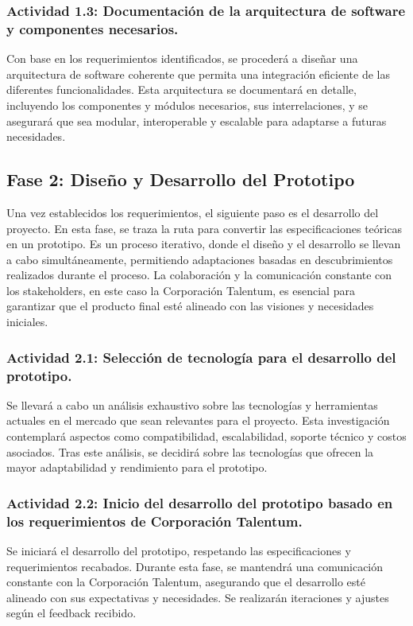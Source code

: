 \subsubsection{Actividad 1.3: Documentación de la arquitectura de software y componentes necesarios.}
Con base en los requerimientos identificados, se procederá a diseñar una arquitectura de software coherente que permita una integración eficiente de las diferentes funcionalidades. Esta arquitectura se documentará en detalle, incluyendo los componentes y módulos necesarios, sus interrelaciones, y se asegurará que sea modular, interoperable y escalable para adaptarse a futuras necesidades.

\subsection{Fase 2: Diseño y Desarrollo del Prototipo}
Una vez establecidos los requerimientos, el siguiente paso es el desarrollo del proyecto. En esta fase, se traza la ruta para convertir las especificaciones teóricas en un prototipo. Es un proceso iterativo, donde el diseño y el desarrollo se llevan a cabo simultáneamente, permitiendo adaptaciones basadas en descubrimientos realizados durante el proceso. La colaboración y la comunicación constante con los stakeholders, en este caso la Corporación Talentum, es esencial para garantizar que el producto final esté alineado con las visiones y necesidades iniciales.

\subsubsection{Actividad 2.1: Selección de tecnología para el desarrollo del prototipo.}
Se llevará a cabo un análisis exhaustivo sobre las tecnologías y herramientas actuales en el mercado que sean relevantes para el proyecto. Esta investigación contemplará aspectos como compatibilidad, escalabilidad, soporte técnico y costos asociados. Tras este análisis, se decidirá sobre las tecnologías que ofrecen la mayor adaptabilidad y rendimiento para el prototipo.

\subsubsection{Actividad 2.2: Inicio del desarrollo del prototipo basado en los requerimientos de Corporación Talentum.}
Se iniciará el desarrollo del prototipo, respetando las especificaciones y requerimientos recabados. Durante esta fase, se mantendrá una comunicación constante con la Corporación Talentum, asegurando que el desarrollo esté alineado con sus expectativas y necesidades. Se realizarán iteraciones y ajustes según el feedback recibido.

